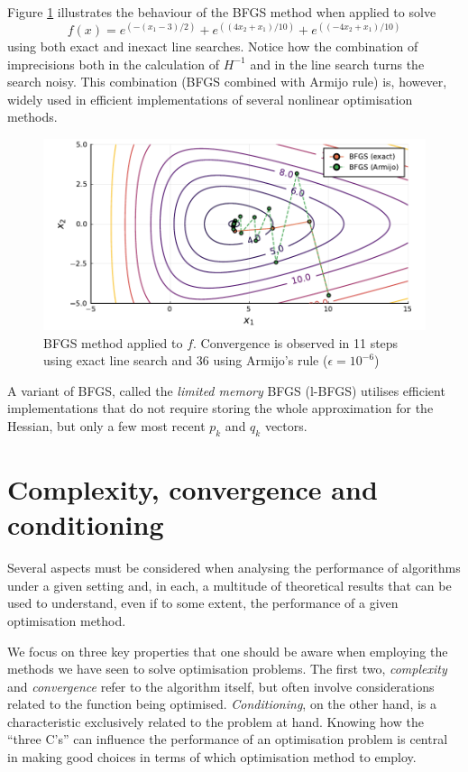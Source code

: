 Figure \ref{fig:BFGS} illustrates the behaviour of the BFGS method when applied to solve 
$$
f(x)=e^{(-(x_1-3)/2)} + e^{((4x_2 + x_1)/10)} + e^{((-4x_2 + x_1)/10)}
$$ 
using both exact and inexact line searches. Notice how the combination of imprecisions both in the calculation of $H^{-1}$ and in the line search turns the search noisy. This combination (BFGS combined with Armijo rule) is, however, widely used in efficient implementations of several nonlinear optimisation methods.

\begin{figure}
\includegraphics[width=\textwidth]{part_2/chapter_6/figures/bfgs.pdf}
\caption{BFGS method applied to $f$. Convergence is observed in 11 steps	using exact line search and 36 using Armijo's rule ($\epsilon = 10^{-6}$)} \label{fig:BFGS}	
\end{figure}



A variant of BFGS, called the \emph{limited memory} BFGS (l-BFGS) utilises  efficient implementations that do not require storing the whole approximation for the Hessian, but only a few most recent $p_k$ and $q_k$ vectors.


\section{Complexity, convergence and conditioning}

Several aspects must be considered when analysing the performance of algorithms under a given setting and, in each, a multitude of theoretical results that can be used to understand, even if to some extent, the performance of a given optimisation method.

We focus on three key properties that one should be aware when employing the methods we have seen to solve optimisation problems. The first two, \emph{complexity} and \emph{convergence} refer to the algorithm itself, but often involve considerations related to the function being optimised. \emph{Conditioning}, on the other hand, is a characteristic exclusively related to the problem at hand. Knowing how the ``three C's'' can influence the performance of an optimisation problem is central in making good choices in terms of which optimisation method to employ. 


